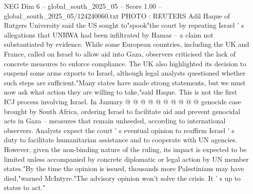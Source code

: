 \begin{textsample}{NEG Dim 6 – global\_south\_2025\_05 – Score 1.00 – global\_south\_2025\_05/124240060.txt}
PHOTO : REUTERS Adil Haque of Rutgers University said the US sought to"spook"the court by repeating Israel ' s allegations that UNRWA had been infiltrated by Hamas -- a claim not substantiated by evidence.
While some European countries, including the UK and France, called on Israel to allow aid into Gaza, observers criticised the lack of concrete measures to enforce compliance.
The UK also highlighted its decision to suspend some arms exports to Israel, although legal analysts questioned whether such steps are sufficient."Many states have made strong statements, but we must now ask what action they are willing to take,"said Haque.
This is not the first ICJ process involving Israel.
In January @ @ @ @ @ @ @ @ @ @ genocide case brought by South Africa, ordering Israel to facilitate aid and prevent genocidal acts in Gaza -- measures that remain unheeded, according to international observers.
Analysts expect the court ' s eventual opinion to reaffirm Israel ' s duty to facilitate humanitarian assistance and to cooperate with UN agencies.
However, given the non-binding nature of the ruling, its impact is expected to be limited unless accompanied by concrete diplomatic or legal action by UN member states."By the time the opinion is issued, thousands more Palestinians may have died,"warned McIntyre."The advisory opinion won't solve the crisis.
It ' s up to states to act."

\end{textsample}
